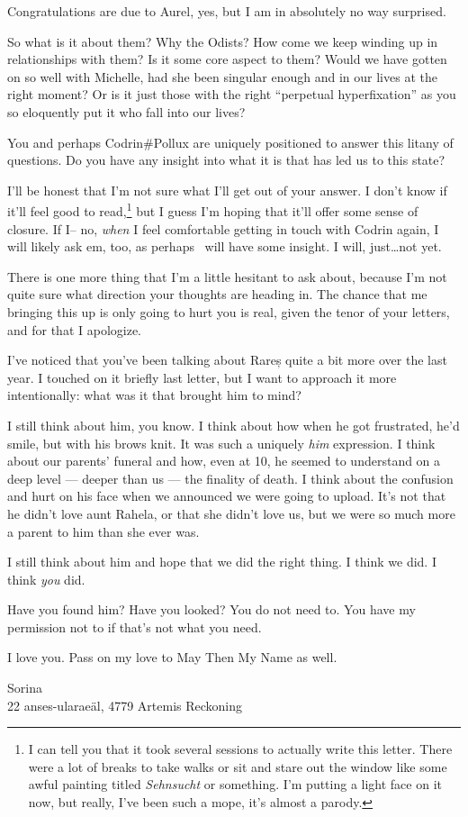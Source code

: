Congratulations are due to Aurel, yes, but I am in absolutely no way surprised.

So what is it about them? Why the Odists? How come we keep winding up in relationships with them? Is it some core aspect to them? Would we have gotten on so well with Michelle, had she been singular enough and in our lives at the right moment? Or is it just those with the right ``perpetual hyperfixation'' as you so eloquently put it who fall into our lives?

You and perhaps Codrin\#Pollux are uniquely positioned to answer this litany of questions. Do you have any insight into what it is that has led us to this state?

I'll be honest that I'm not sure what I'll get out of your answer. I don't know if it'll feel good to read,\footnote{I can tell you that it took several sessions to actually write this letter. There were a lot of breaks to take walks or sit and stare out the window like some awful painting titled \emph{Sehnsucht} or something. I'm putting a light face on it now, but really, I've been such a mope, it's almost a parody.} but I guess I'm hoping that it'll offer some sense of closure. If I-- no, \emph{when} I feel comfortable getting in touch with Codrin again, I will likely ask em, too, as perhaps \Partner\ will have some insight. I will, just\ldots not yet.

There is one more thing that I'm a little hesitant to ask about, because I'm not quite sure what direction your thoughts are heading in. The chance that me bringing this up is only going to hurt you is real, given the tenor of your letters, and for that I apologize.

I've noticed that you've been talking about Rareș quite a bit more over the last year. I touched on it briefly last letter, but I want to approach it more intentionally: what was it that brought him to mind?

I still think about him, you know. I think about how when he got frustrated, he'd smile, but with his brows knit. It was such a uniquely \emph{him} expression. I think about our parents' funeral and how, even at 10, he seemed to understand on a deep level — deeper than us — the finality of death. I think about the confusion and hurt on his face when we announced we were going to upload. It's not that he didn't love aunt Rahela, or that she didn't love us, but we were so much more a parent to him than she ever was.

I still think about him and hope that we did the right thing. I think we did. I think \emph{you} did.

Have you found him? Have you looked? You do not need to. You have my permission not to if that's not what you need.

I love you. Pass on my love to May Then My Name as well.

Sorina\\
22 anses-ularaeäl, 4779 Artemis Reckoning
